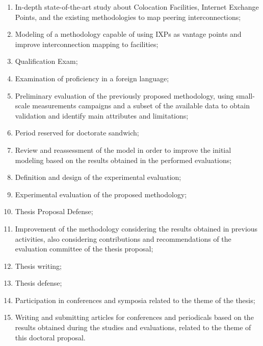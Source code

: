 \begin{enumerate}

\item In-depth state-of-the-art study about Colocation Facilities, Internet Exchange Points, and the existing methodologies to map peering interconnections; \label{it:estado-da-arte}

\item Modeling of a methodology capable of using IXPs as vantage points and improve interconnection mapping to facilities; \label{it:modelagem}

\item Qualification Exam; \label{it:qualif}

\item Examination of proficiency in a foreign language; \label{it:idioma}

\item Preliminary evaluation of the previously proposed methodology, using small-scale measurements campaigns and a subset of the available data to obtain validation and identify main attributes and limitations; \label{it:aval-anali}

\item Period reserved for doctorate sandwich; \label{it:sanduba}

\item Review and reassessment of the model in order to improve the initial modeling based on the results obtained in the performed evaluations; \label{it:rev-modelo}

\item Definition and design of the experimental evaluation; \label{it:proj-amb-exp}

\item Experimental evaluation of the proposed methodology; \label{it:aval-larga-escala}

\item Thesis Proposal Defense; \label{it:def-prop-tese}

\item Improvement of the methodology considering the results obtained in previous activities, also considering contributions and recommendations of the evaluation committee of the thesis proposal; \label{it:rev-final-modelo}

\item Thesis writing; \label{it:redacao}

\item Thesis defense; \label{it:def-tese}

\item Participation in conferences and symposia related to the theme of the thesis; \label{it:part-cong}

\item Writing and submitting articles for conferences and periodicals based on the results obtained during the studies and evaluations, related to the theme of this doctoral proposal. \label{it:submissoes}
\end{enumerate}


